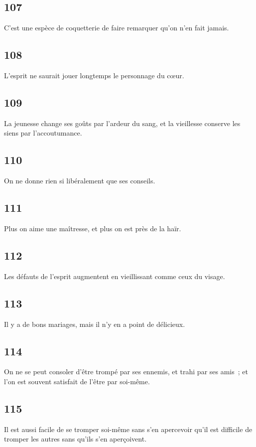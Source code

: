 \documentclass[french,twoside]{book} %
\begin{document}
\subsection[{107}]{ \textsc{107} }
\noindent C’est une espèce de coquetterie de faire remarquer qu’on n’en fait jamais.
\subsection[{108}]{ \textsc{108} }
\noindent L’esprit ne saurait jouer longtemps le personnage du cœur.
\subsection[{109}]{ \textsc{109} }
\noindent La jeunesse change ses goûts par l’ardeur du sang, et la vieillesse conserve les siens par l’accoutumance.
\subsection[{110}]{ \textsc{110} }
\noindent On ne donne rien si libéralement que ses conseils.
\subsection[{111}]{ \textsc{111} }
\noindent Plus on aime une maîtresse, et plus on est près de la haïr.
\subsection[{112}]{ \textsc{112} }
\noindent Les défauts de l’esprit augmentent en vieillissant comme ceux du visage.
\subsection[{113}]{ \textsc{113} }
\noindent Il y a de bons mariages, mais il n’y en a point de délicieux.
\subsection[{114}]{ \textsc{114} }
\noindent On ne se peut consoler d’être trompé par ses ennemis, et trahi par ses amis ; et l’on est souvent satisfait de l’être par soi-même.
\subsection[{115}]{ \textsc{115} }
\noindent Il est aussi facile de se tromper soi-même sans s’en apercevoir qu’il est difficile de tromper les autres sans qu’ils s’en aperçoivent.
\end{document}
